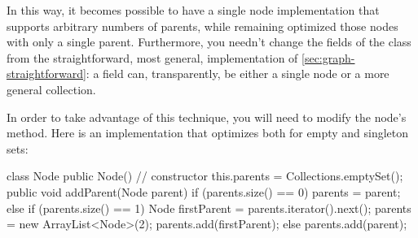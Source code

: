 
In this way, it becomes possible to have a single node implementation that
supports arbitrary numbers of parents, while remaining optimized those nodes
with only a single parent. Furthermore, you needn't change the fields of the
 class from the straightforward, most general, implementation of
\autoref{sec:graph-straightforward}: a field 
can, transparently, be either a single node or a more general collection.



In order to take advantage of this technique, you will need to modify the node's
 method. Here is an implementation that optimizes both for
empty and singleton sets:

\begin{shortlisting}
class Node {
  public Node() { // constructor
     this.parents = Collections.emptySet();
  }
  public void addParent(Node parent) {
     if (parents.size() == 0) parents = parent;
     else if (parents.size() == 1) {
        Node firstParent = parents.iterator().next();
        parents = new ArrayList<Node>(2);
        parents.add(firstParent);
     } else {
        parents.add(parent);
     }
  }
}
\end{shortlisting} 

